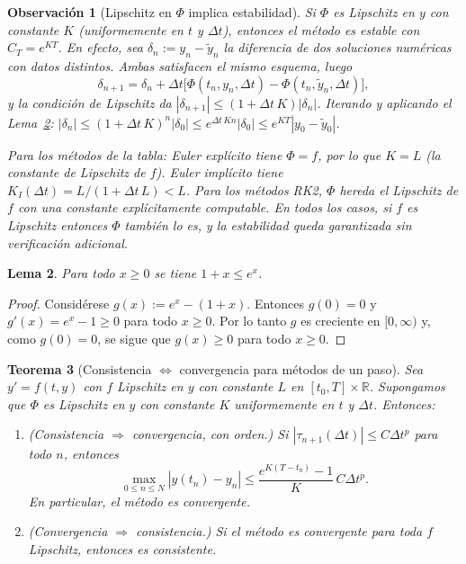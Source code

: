 \documentclass[a4paper,11pt]{report}
\newtheorem{theorem}{Teorema}[chapter]
\newtheorem{lemma}[theorem]{Lema}
\newtheorem{remark}[theorem]{Observación}
\begin{document}
\begin{remark}[Lipschitz en $\Phi$ implica estabilidad]
Si $\Phi$ es Lipschitz en $y$ con constante $K$ (uniformemente en $t$ y $\Delta t$), entonces el método es estable con $C_T = e^{KT}$. En efecto, sea $\delta_n := y_n - \tilde y_n$ la diferencia de dos soluciones numéricas con datos distintos. Ambas satisfacen el mismo esquema, luego
\[
  \delta_{n+1} = \delta_n + \Delta t\bigl[\Phi(t_n,y_n,\Delta t) - \Phi(t_n,\tilde y_n,\Delta t)\bigr],
\]
y la condición de Lipschitz da $|\delta_{n+1}| \le (1+\Delta t\,K)|\delta_n|$. Iterando y aplicando el Lema~\ref{lem:exp_bound_new}: $|\delta_n| \le (1+\Delta t\,K)^n|\delta_0| \le e^{\Delta t\,Kn}|\delta_0| \le e^{KT}|y_0-\tilde y_0|$.

Para los métodos de la tabla: Euler explícito tiene $\Phi=f$, por lo que $K=L$ (la constante de Lipschitz de $f$). Euler implícito tiene $K_I(\Delta t)=L/(1+\Delta t\,L)<L$. Para los métodos RK2, $\Phi$ hereda el Lipschitz de $f$ con una constante explícitamente computable. En todos los casos, si $f$ es Lipschitz entonces $\Phi$ también lo es, y la estabilidad queda garantizada \emph{sin verificación adicional}.
\end{remark}

\begin{lemma}\label{lem:exp_bound_new}
Para todo $x\ge 0$ se tiene $1+x\le e^x$.
\end{lemma}
\begin{proof}
Considérese $g(x):=e^x-(1+x)$. Entonces $g(0)=0$ y $g'(x)=e^x-1\ge 0$ para todo $x\ge 0$. Por lo tanto $g$ es creciente en $[0,\infty)$ y, como $g(0)=0$, se sigue que $g(x)\ge 0$ para todo $x\ge 0$.
\end{proof}

\begin{theorem}[Consistencia $\Leftrightarrow$ convergencia para métodos de un paso]\label{thm:one_step_lax_new}
Sea $y'=f(t,y)$ con $f$ Lipschitz en $y$ con constante $L$ en $[t_0,T]\times\mathbb{R}$. Supongamos que $\Phi$ es Lipschitz en $y$ con constante $K$ uniformemente en $t$ y $\Delta t$. Entonces:
\begin{enumerate}
  \item \emph{(Consistencia $\Rightarrow$ convergencia, con orden.)} Si $|\tau_{n+1}(\Delta t)|\le C\Delta t^p$ para todo $n$, entonces
  \[
    \max_{0\le n\le N}|y(t_n)-y_n|\le \frac{e^{K(T-t_0)}-1}{K}\,C\Delta t^p.
  \]
  En particular, el método es convergente.
  \item \emph{(Convergencia $\Rightarrow$ consistencia.)} Si el método es convergente para toda $f$ Lipschitz, entonces es consistente.
\end{enumerate}
\end{theorem}
\end{document}
